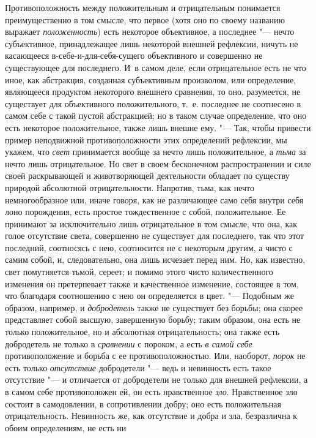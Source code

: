 Противоположность между положительным и отрицательным понимается
преимущественно в том смысле, что первое (хотя оно по своему названию
выражает {\em положенность}) есть некоторое
объективное, а последнее "--- нечто субъективное, принадлежащее лишь некоторой
внешней рефлексии, ничуть не касающееся в-себе-и-для-себя-сущего
объективного и совершенно не существующее для последнего. И~в самом деле,
если отрицательное есть не что иное, как абстракция, созданная субъективным
произволом, или определение, являющееся продуктом некоторого внешнего
сравнения, то оно, разумеется, не существует для объективного
положительного, т.~е. последнее не соотнесено в самом себе с такой пустой
абстракцией; но в таком случае определение, что оно есть некоторое
положительное, также лишь внешне ему. "--- Так, чтобы привести пример
неподвижной противоположности этих определений рефлексии, мы укажем, что
{\em свет} принимается вообще за нечто лишь
положительное, а {\em тьма} за нечто лишь
отрицательное. Но свет в своем бесконечном распространении и силе своей
раскрывающей и животворяющей деятельности обладает по существу природой
абсолютной отрицательности. Напротив, тьма, как нечто немногообразное или,
иначе говоря, как не различающее само себя внутри себя лоно порождения,
есть простое тождественное с собой, положительное. Ее принимают за
исключительно лишь отрицательное в том смысле, что она, как голое
отсутствие света, совершенно не существует для последнего, так что этот
последний, соотносясь с нею, соотносится не с некоторым другим, а чисто с
самим собой, и, следовательно, она лишь исчезает перед ним. Но, как
известно, свет помутняется тьмой, сереет; и помимо этого чисто
количественного изменения он претерпевает также и качественное изменение,
состоящее в том, что благодаря соотношению с нею он определяется
в цвет. "--- Подобным же образом, например, и {\em добродетель}
также не существует без борьбы; она скорее представляет собой высшую,
завершенную борьбу; таким образом, она есть не только положительное, но и
абсолютная отрицательность; она также есть добродетель не только в
{\em сравнении} с пороком, а есть
{\em в самой себе} противоположение и борьба с ее
противоположностью. Или, наоборот, {\em порок} не есть
только {\em отсутствие} добродетели "--- ведь и невинность
есть такое отсутствие "--- и отличается от добродетели не только для внешней
рефлексии, а в самом себе противоположен ей, он есть нравственное
{\em зло}. Нравственное зло состоит в самодовлении, в
сопротивлении добру; оно есть положительная отрицательность. Невинность же,
как отсутствие и добра и зла, безразлична к обоим определениям, не есть ни
